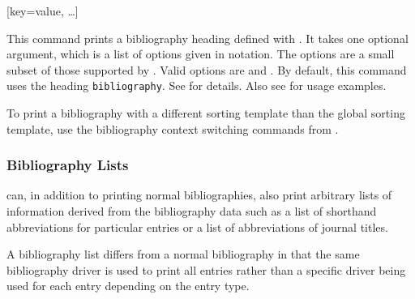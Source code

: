 \documentclass{ltxdockit}[2011/03/25]
\newcommand*{\biblatex}{\sty{biblatex}\xspace}
\begin{document}
\begin{ltxsyntax}
[key=value, \dots]

This command prints a bibliography heading defined with . It takes one optional argument, which is a list of options given in \keyval notation. The options are a small subset of those supported by . Valid options are  and . By default, this command uses the heading \texttt{bibliography}. See  for details. Also see  for usage examples.

\end{ltxsyntax}
%
To print a bibliography with a different sorting template than the global sorting template, use the bibliography context switching commands from .

\subsubsection{Bibliography Lists}
\label{use:bib:biblist}

\biblatex can, in addition to printing normal bibliographies, also print arbitrary lists of information derived from the bibliography data such as a list of shorthand abbreviations for particular entries or a list of abbreviations of journal titles.

A bibliography list differs from a normal bibliography in that the same bibliography driver is used to print all entries rather than a specific driver being used for each entry depending on the entry type.
\end{document}
